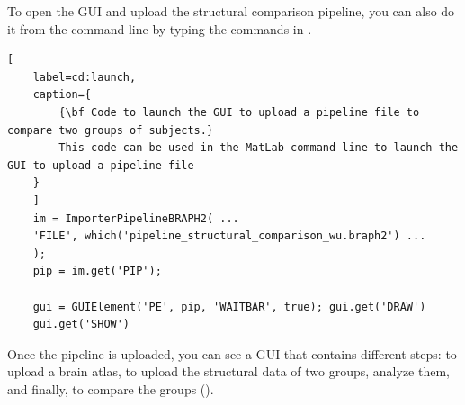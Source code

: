 \documentclass[justified]{tufte-handout}
\begin{document}
\begin{tcolorbox}[
	title=Pipeline launch from command line
	]
	To open the GUI and upload the structural comparison pipeline, you can also do it from the command line by typing the commands in .

\begin{lstlisting}[
	label=cd:launch,
	caption={
		{\bf Code to launch the GUI to upload a pipeline file to compare two groups of subjects.}
		This code can be used in the MatLab command line to launch the GUI to upload a pipeline file
	}
	]
	im = ImporterPipelineBRAPH2( ...
	'FILE', which('pipeline_structural_comparison_wu.braph2') ...
	);
	pip = im.get('PIP');
	
	gui = GUIElement('PE', pip, 'WAITBAR', true); gui.get('DRAW')
	gui.get('SHOW')
\end{lstlisting}
\end{tcolorbox}


Once the pipeline is uploaded, you can see a GUI that contains different steps: to upload a brain atlas, to upload the structural data of two groups, analyze them, and finally, to compare the groups (). 
\end{document}
